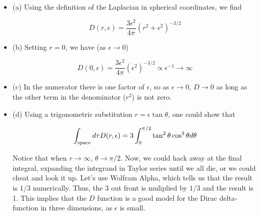 \documentclass[10pt]{article}
\begin{document}
\begin{itemize}
\item (a) Using the definition of the Laplacian in spherical coordinates, we find

\begin{equation}
D(r,\epsilon) = \frac{3\epsilon^2}{4\pi} (r^2+\epsilon^2)^{-3/2}
\end{equation}

\item (b) Setting $r = 0$, we have (as $\epsilon \to 0$)

\begin{equation}
D(0,\epsilon) = \frac{3\epsilon^2}{4\pi} (\epsilon^2)^{-3/2} \propto \epsilon^{-1} \to \infty
\end{equation}

\item (c) In the numerator there is one factor of $\epsilon$, so as $\epsilon \to 0$, $D \to 0$ as long as the other term in the denominator ($r^2$) is not zero.

\item (d) Using a trigonometric substitution $r = \epsilon \tan\theta$, one could show that

\begin{equation}
\int_{\rm space} d\tau D(r,\epsilon) = 3 \int_{0}^{\pi/2} \tan^2\theta \cos^3\theta d\theta
\end{equation}

Notice that when $r \to \infty$, $\theta \to \pi/2$. Now, we could hack away at the final integral, expanding the integrand in Taylor series until we all die, or we could cheat and look it up.  Let's use Wolfram Alpha, which tells us that the result is $1/3$ numerically. Thus, the 3 out front is muliplied by $1/3$ and the result is 1.  This implies that the $D$ function is a good model for the Dirac delta-function in three dimensions, as $\epsilon$ is small.

\end{itemize}
\end{document}
